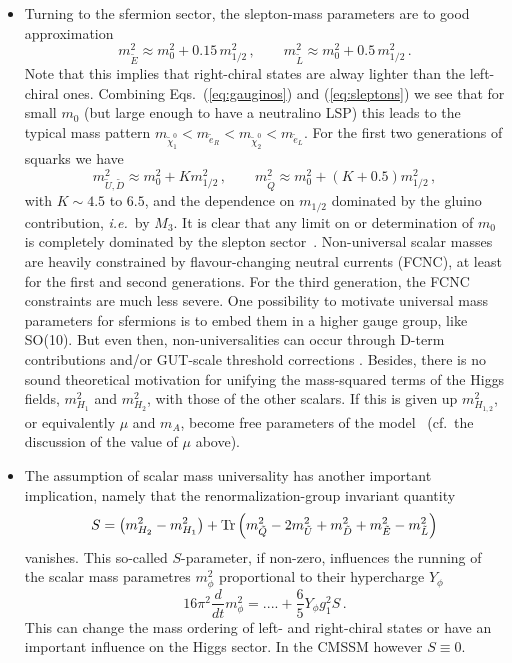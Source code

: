 \begin{itemize}
\item Turning to the sfermion sector, the slepton-mass parameters are to good approximation
\begin{equation}
  m_{\tilde E}^2 \approx m_0^2 + 0.15\,m_{1/2}^2\,, \qquad 
  m_{\tilde L}^2 \approx m_0^2 + 0.5\,m_{1/2}^2\,. 
  \label{eq:sleptons}
\end{equation}
Note that this implies that right-chiral states are alway lighter 
than the left-chiral ones. Combining Eqs.~(\ref{eq:gauginos}) and 
(\ref{eq:sleptons}) we see that for small $m_0$ (but large enough 
to have a neutralino LSP) this leads to the typical mass pattern 
$m_{\tilde\chi^0_1}<m_{\tilde e_R}<m_{\tilde\chi^0_2}<m_{\tilde e_L}$.  
For the first two generations of squarks we have 
\begin{equation}
  m_{\tilde U, \tilde D}^2 \approx m_0^2 + K m_{1/2}^2\,, \qquad 
  m_{\tilde Q}^2 \approx m_0^2 + (K+0.5)m_{1/2}^2\,, 
\end{equation}
with $K\sim4.5$ to $6.5$, and the dependence on $m_{1/2}$ dominated by the 
gluino contribution, {\it i.e.}\ by $M_3$. It is clear that any limit on 
or determination of $m_0$ is completely dominated by the slepton 
sector~\cite{Allanach:2006fy}. 
Non-universal scalar masses are heavily constrained by flavour-changing 
neutral currents (FCNC), at least for the first and second generations. 
For the third generation, the FCNC constraints are much less severe. 
One possibility to motivate universal mass parameters for sfermions is 
to embed them in a higher gauge group, like SO(10). But even then, 
non-universalities can occur through D-term contributions \cite{Kolda:1995iw} 
and/or GUT-scale threshold corrections \cite{Polonsky:1994sr,Polonsky:1994rz}. 
Besides, there is no sound theoretical motivation for unifying the 
mass-squared terms of the Higgs fields, $m_{H_1}^2$ and $m_{H_2}^2$,
with those of the other scalars. 
If this is given up $m_{H_{1,2}}^2$, or equivalently $\mu$ and $m_A$,
become free parameters of the model~\cite{Ellis:2002wv} 
(cf.\ the discussion of the value of $\mu$ above).

\item The assumption of scalar mass universality has another important 
implication, namely that the renormalization-group invariant quantity  
\begin{equation}
  S = \left(m_{H_2}^2-m_{H_1}^2\right) + {\rm Tr}\left(
      m_{\tilde Q}^2-2m_{\tilde U}^2+m_{\tilde D}^2
      +m_{\tilde E}^2-m_{\tilde L}^2\right)
\end{equation}
vanishes. This so-called $S$-parameter, if non-zero, influences 
the running of the scalar mass parametres $m_\phi^2$ proportional to 
their hypercharge $Y_\phi$
\begin{equation}
   16\pi^2\frac{d}{dt}m_\phi^2= .... + \frac{6}{5}Y_\phi g_1^2S\,.
\end{equation}
This can change the mass ordering of left- and right-chiral states 
or have an important influence on the Higgs sector. 
In the CMSSM however $S\equiv 0$.

\end{itemize}

